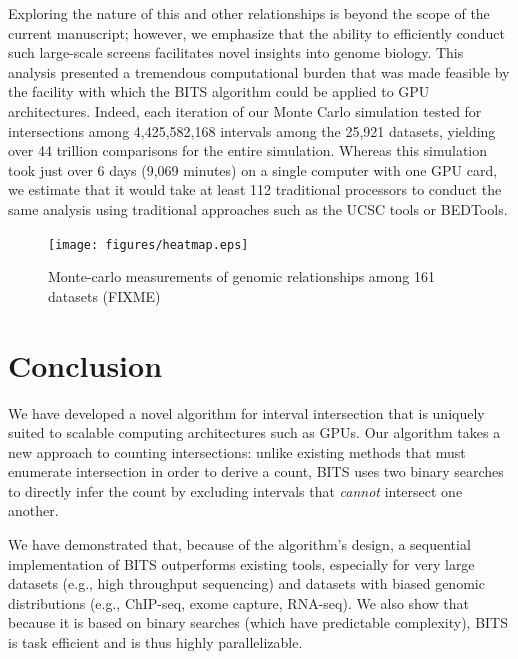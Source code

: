 \documentclass{bioinfo}
\begin{document}
        Exploring the nature of this and other relationships is beyond the 
        scope of the current manuscript; however, we emphasize that the ability 
        to efficiently conduct such large-scale screens facilitates novel 
        insights into genome biology. This analysis presented a tremendous
        computational burden that was made feasible by the facility with which
        the BITS algorithm could be applied to GPU architectures. Indeed, each
        iteration of our Monte Carlo simulation tested for
        intersections among 4,425,582,168 intervals among the 25,921 datasets,
        yielding over 44 trillion comparisons for the entire simulation. Whereas
        this simulation took just over 6 days (9,069 minutes) on a single
        computer with one GPU card, we estimate that it would take at least 
        112 traditional processors to conduct the same analysis using 
        traditional approaches such as the UCSC tools or BEDTools.
        
        \begin{figure}[t]
                \texttt{[image: figures/heatmap.eps]}
                \caption[]{Monte-carlo measurements of genomic relationships among 161 datasets (FIXME)}
        \end{figure}
        

        
     
        \section{Conclusion}
        We have developed a novel algorithm for interval intersection that
        is uniquely suited to scalable computing architectures such as GPUs.
        Our algorithm takes a new approach to counting intersections: 
        unlike existing methods that must enumerate intersection in order to 
        derive a count, BITS uses two binary searches to directly infer the 
        count by excluding intervals that \emph{cannot} intersect one another. 
        
        We have demonstrated that, because of the algorithm's design,
        a sequential implementation of BITS outperforms existing tools, 
        especially for very large datasets (e.g., high throughput sequencing) 
        and datasets with biased 
        genomic distributions (e.g., ChIP-seq, exome capture, RNA-seq). We also 
        show that because it is based on binary searches (which have predictable 
        complexity), BITS is task efficient and is thus highly parallelizable.
        
\end{document}
